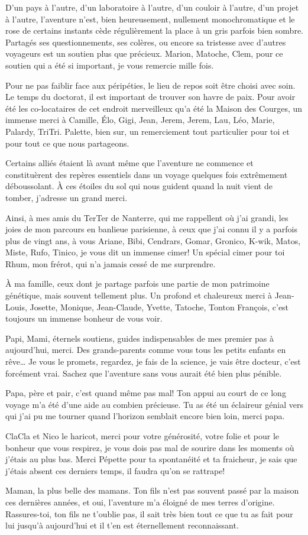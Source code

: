 D'un pays à l'autre, d'un laboratoire à l'autre, d'un couloir à l'autre,
d'un projet à l'autre, l'aventure n'est, bien heureusement, nullement
monochromatique et le rose de certains instants cède régulièrement la
place à un gris parfois bien sombre. Partagés ses questionnements, ses
colères, ou encore sa tristesse avec d'autres voyageurs est un soutien
plus que précieux. Marion, Matoche, Clem, pour ce soutien qui a été si
important, je vous remercie mille fois.

Pour ne pas faiblir face aux péripéties, le lieu de repos soit être
choisi avec soin. Le temps du doctorat, il est important de trouver son
havre de paix. Pour avoir été les co-locataires de cet endroit
merveilleux qu'a été la Maison des Courges, un immense merci à Camille,
Élo, Gigi, Jean, Jerem, Jerem, Lau, Léo, Marie, Palardy, TriTri.
Palette, bien sur, un remerciement tout particulier pour toi et pour
tout ce que nous partageons.

Certains alliés étaient là avant même que l'aventure ne commence et
constituèrent des repères essentiels dans un voyage quelques fois
extrêmement déboussolant. À ces étoiles du sol qui nous guident quand la
nuit vient de tomber, j'adresse un grand merci.

Ainsi, à mes amis du TerTer de Nanterre, qui me rappellent où j'ai
grandi, les joies de mon parcours en banlieue parisienne, à ceux que
j'ai connu il y a parfois plus de vingt ans, à vous Ariane, Bibi,
Cendrars, Gomar, Gronico, K-wik, Matos, Miste, Rufo, Tinico, je vous dit
un immense cimer! Un spécial cimer pour toi Rhum, mon frérot, qui n'a
jamais cessé de me surprendre.

À ma famille, ceux dont je partage parfois une partie de mon patrimoine
génétique, mais souvent tellement plus. Un profond et chaleureux merci à
Jean-Louis, Josette, Monique, Jean-Claude, Yvette, Tatoche, Tonton
François, c'est toujours un immense bonheur de vous voir.

Papi, Mami, éternels soutiens, guides indispensables de mes premier pas
à aujourd'hui, merci. Des grands-parents comme vous tous les petits
enfants en rêve\ldots{} Je vous le promets, regardez, je fais de la
science, je vais être docteur, c'est forcément vrai. Sachez que
l'aventure sans vous aurait été bien plus pénible.

Papa, père et pair, c'est quand même pas mal! Ton appui au court de ce
long voyage m'a été d'une aide au combien précieuse. Tu as été un
éclaireur génial vers qui j'ai pu me tourner quand l'horizon semblait
encore bien loin, merci papa.

ClaCla et Nico le haricot, merci pour votre générosité, votre folie et
pour le bonheur que vous respirez, je vous dois pas mal de sourire dans
les moments où j'étais au plus bas. Merci Pépette pour ta spontanéité et
ta fraicheur, je sais que j'étais absent ces derniers temps, il faudra
qu'on se rattrape!

Maman, la plus belle des mamans. Ton fils n'est pas souvent passé par la
maison ces dernières années, et oui, l'aventure m'a éloigné de mes
terres d'origine. Rassures-toi, ton fils ne t'oublie pas, il sait très
bien tout ce que tu as fait pour lui jusqu'à aujourd'hui et il t'en est
éternellement reconnaissant.
